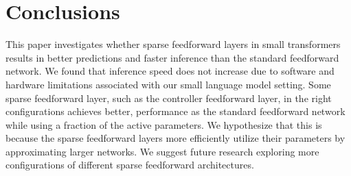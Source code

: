 \section{Conclusions}
\label{sec:conclusion}
This paper investigates whether sparse feedforward layers in small transformers results in better predictions and faster inference than the standard feedforward network. We found that inference speed does not increase due to software and hardware limitations associated with our small language model setting. Some sparse feedforward layer, such as the controller feedforward layer, in the right configurations achieves better, performance as the standard feedforward network while using a fraction of the active parameters. We hypothesize that this is because the sparse feedforward layers more efficiently utilize their parameters by approximating larger networks. We suggest future research exploring more configurations of different sparse feedforward architectures.




